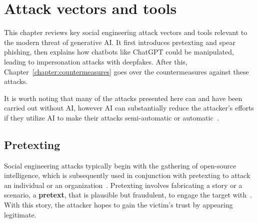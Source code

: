 


\chapter{Attack vectors and tools \label{chapter:attacks}}
\begin{comment}

Guides:
    - About 3-4 pages

What to cover:
    - Attacks
        - Deepfake generated synthetic media

\end{comment}

This chapter reviews key social engineering attack vectors and tools relevant to the modern threat of generative AI. It first introduces pretexting and spear phishing, then explains how chatbots like ChatGPT could be manipulated, leading to impersonation attacks with deepfakes. After this, Chapter~\ref{chapter:countermeasures} goes over the countermeasures against these attacks.

It is worth noting that many of the attacks presented here can and have been carried out without AI, however AI can substantially reduce the attacker's efforts if they utilize AI to make their attacks semi-automatic or automatic~\citep{mirsky_Threat_Offensive_AI_Organizations_2023}.




\section{Pretexting}
\begin{comment}

    - How AI powers up pretexting?
        - How AI tech can be utilized to create more sophisticated and convincing pretexts
        - Examples of successful pretexting attacks and their impacts
        - Analysis of pretexting evolving landscape with AI
    - Ethical considerations?
        
\end{comment}

Social engineering attacks typically begin with the gathering of open-source intelligence, which is subsequently used in conjunction with pretexting to attack an individual or an organization~\citep{hadnagy_Social_Engineering_The_Science_2018}. Pretexting involves fabricating a story or a scenario, a \textbf{pretext}, that is plausible but fraudulent, to engage the target with~\citep{wang_Defining_Social_Engineering_2020}. With this story, the attacker hopes to gain the victim's trust by appearing legitimate. 

